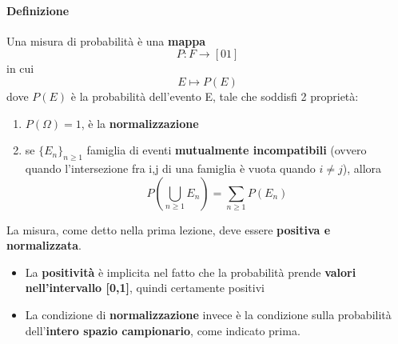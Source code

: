 \documentclass{report}
\begin{document}
\paragraph{Definizione} Una misura di probabilità è una \textbf{mappa} \[P: \textit{F} \longrightarrow [01]\] in cui \[E \longmapsto P(E)\] dove \(P(E)\) è la probabilità dell'evento E, tale che soddisfi 2 proprietà: \begin{enumerate}
    \item \(P(\Omega) = 1\), è la \textbf{normalizzazione}
    \item se \(\{E_n\}_{n \geq 1}\) famiglia di eventi \textbf{mutualmente incompatibili} (ovvero\\ quando l'intersezione fra i,j di una famiglia è vuota quando \(i \neq j\)), allora \[P(\bigcup_{n \geq 1}E_n) = \sum_{n \geq 1} P(E_n)\]
\end{enumerate}
La misura, come detto nella prima lezione, deve essere \textbf{positiva e normalizzata}. \begin{itemize}
    \item La \textbf{positività} è implicita nel fatto che la probabilità prende \textbf{valori nell'intervallo [0,1]}, quindi certamente positivi
    \item La condizione di \textbf{normalizzazione} invece è la condizione sulla probabilità dell'\textbf{intero spazio campionario}, come indicato prima.
\end{itemize}
\end{document}
